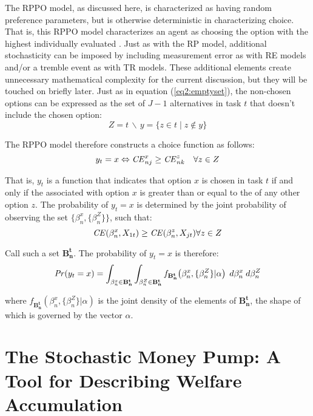 \documentclass[../main.tex]{subfiles}
\begin{document}
The RPPO model, as discussed here, is characterized as having random preference parameters, but is otherwise deterministic in characterizing choice.
That is, this RPPO model characterizes an agent as choosing the option with the highest individually evaluated {\CE}.
Just as with the RP model, additional stochasticity can be imposed by including measurement error as with RE models and/or a tremble event as with TR models.
These additional elements create unnecessary mathematical complexity for the current discussion, but they will be touched on briefly later.
Just as in equation (\ref{eq2:emptyset}), the non-chosen options can be expressed as the set of $J-1$ alternatives in task $t$ that doesn't include the chosen option:
\begin{equation}
	\label{eq2:RPPO:emptyset}
	Z = t \,\backslash\, y = \{z \in t \;|\; z \notin y \}
\end{equation}


\noindent The RPPO model therefore constructs a choice function as follows:
\begin{equation}
	\label{RPPO.y0}
	y_t = x \Leftrightarrow {\ensuremath{\mathit{CE}}}_{nj}^x \geq {\ensuremath{\mathit{CE}}}_{nk}^z \quad \forall z \in Z
\end{equation}

That is, $y_t$ is a function that indicates that option $x$ is chosen in task $t$ if and only if the {\CE} associated with option $x$ is greater than or equal to the {\CE} of any other option $z$.
The probability of $y_t = x$ is determined by the joint probability of observing the set $\bigl\{\beta_n^x,\{\beta_n^Z\}\bigr\}$, such that:
\begin{equation}
	\label{eq2:RPPO.y1}
	{\ensuremath{\mathit{CE}}}(\beta_n^x,X_{1t}) \geq {\ensuremath{\mathit{CE}}}(\beta_n^z,X_{jt}) \forall z \in Z
\end{equation}

\noindent Call such a set $\mathbf{B^t_n}$.
The probability of $y_t=x$ is therefore:
\begin{equation}
	{\ensuremath{\mathit{Pr}}}(y_t=x) = \int_{\beta_n^x \in \mathbf{B^t_n}}\int_{\beta_n^Z \in \mathbf{B^t_n}} f_{\mathbf{B^t_n}}\!\left(\beta_n^x,\{\beta_n^Z\}|\alpha\right) \;d\beta_n^x \; d\beta_n^Z
\end{equation}

\noindent where $f_{\mathbf{B^t_n}}(\beta_n^x,\{\beta_n^Z\}|\alpha)$ is the joint density of the elements of $\mathbf{B^t_n}$, the shape of which is governed by the vector $\alpha$.

\section[The Stochastic Money Pump: A Tool for Describing Welfare \texorpdfstring{\\}{}Accumulation]{The Stochastic Money Pump: A Tool for Describing Welfare\\Accumulation}
\end{document}
